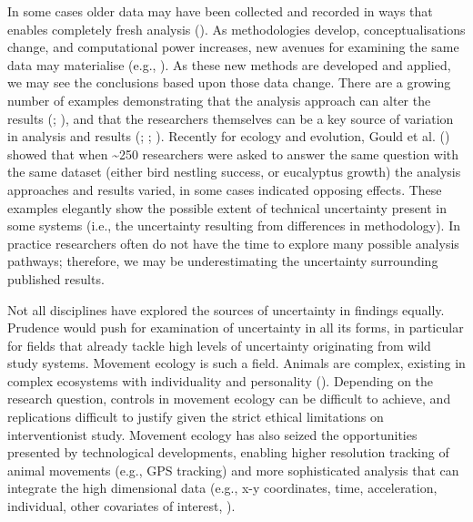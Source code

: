 \documentclass[10pt,a4paper]{article}
\begin{document}
In some cases older data may have been collected and recorded in ways that enables completely fresh analysis ().
As methodologies develop, conceptualisations change, and computational power increases, new avenues for examining the same data may materialise (e.g., ).
As these new methods are developed and applied, we may see the conclusions based upon those data change.
There are a growing number of examples demonstrating that the analysis approach can alter the results (; ), and that the researchers themselves can be a key source of variation in analysis and results (; ; ).
Recently for ecology and evolution, Gould et al. () showed that when \textasciitilde250 researchers were asked to answer the same question with the same dataset (either bird nestling success, or eucalyptus growth) the analysis approaches and results varied, in some cases indicated opposing effects.
These examples elegantly show the possible extent of technical uncertainty present in some systems (i.e., the uncertainty resulting from differences in methodology).
In practice researchers often do not have the time to explore many possible analysis pathways; therefore, we may be underestimating the uncertainty surrounding published results.

Not all disciplines have explored the sources of uncertainty in findings equally.
Prudence would push for examination of uncertainty in all its forms, in particular for fields that already tackle high levels of uncertainty originating from wild study systems.
Movement ecology is such a field.
Animals are complex, existing in complex ecosystems with individuality and personality ().
Depending on the research question, controls in movement ecology can be difficult to achieve, and replications difficult to justify given the strict ethical limitations on interventionist study.
Movement ecology has also seized the opportunities presented by technological developments, enabling higher resolution tracking of animal movements (e.g., GPS tracking) and more sophisticated analysis that can integrate the high dimensional data (e.g., x-y coordinates, time, acceleration, individual, other covariates of interest, ).
\end{document}
